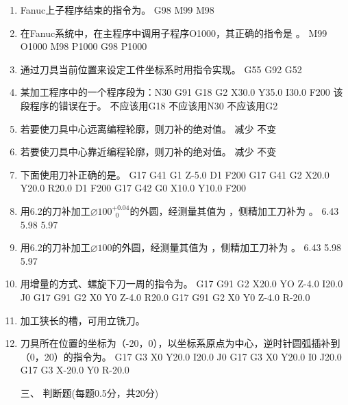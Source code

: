 \documentclass[12pt,twocolumn,landscape,UTF8,twoside]{ctexart}
\begin{document}
\begin{spacing}{1.3}
\begin{enumerate} [1、]
\item Fanuc上子程序结束的指令为。
	{G98}	{M99}	{M98}
\item 在Fanuc系统中，在主程序中调用子程序O1000，其正确的指令是		。
		{M99 O1000}		{M98 P1000}		{G98 P1000}
\item 通过刀具当前位置来设定工件坐标系时用指令实现。
		{G55}		{G92}		{G52}
\item 某加工程序中的一个程序段为：N30 G91 G18 G2 X30.0 Y35.0 I30.0 F200 
该段程序的错误在于。
	{不应该用G18}	{不应该用N30}	{不应该用G2}
\item 若要使刀具中心远离编程轮廓，则刀补的绝对值。
	{减少}	{不变}	
\item 若要使刀具中心靠近编程轮廓，则刀补的绝对值。
	{减少}	{不变}	
\item 下面使用刀补正确的是。
{G17 G41 G1 Z-5.0 D1 F200}
{G17 G41 G2 X20.0 Y20.0 R20.0 D1 F200}
{G17 G42 G0 X10.0 Y10.0 F200}
\item 用6.2的刀补加工$\diameter 100^{+0.04}_{~\; 0}$的外圆，经测量其值为 ，侧精加工刀补为	。
	{6.43}	{5.98}	{5.97}
\item 用6.2的刀补加工$\diameter 100$的外圆，经测量其值为 ，侧精加工刀补为	。
	{6.43}	{5.98}	{5.97}
\item 用增量的方式、螺旋下刀一周的指令为。
{G17 G91 G2 X20.0 YO Z-4.0 I20.0 J0}
{G17 G91 G2 X0 Y0 Z-4.0 R20.0}
{G17 G91 G2 X0 Y0 Z-4.0 R-20.0}
\item 加工狭长的槽，可用立铣刀。
\item 刀具所在位置的坐标为（-20，0），以坐标系原点为中心，逆时针圆弧插补到（0，20）的指令为。
	{G17 G3 X0 Y20.0 I20.0 J0}
{G17 G3 X0 Y20.0 I0 J20.0}		{G17 G3 X-20.0 Y0 R-20.0}				
\item[\heiti 三、] { \heiti 判断题(每题0.5分，共20分)}
		

\end{enumerate}
\end{spacing}
\end{document}

